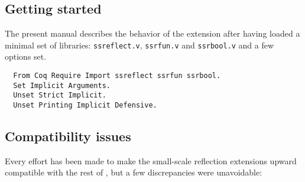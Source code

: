\subsection{Getting started}\label{sec:files}
The present manual describes the behavior of
the \ssr{} extension after having loaded a minimal set of libraries:
{\tt ssreflect.v}, {\tt ssrfun.v} and {\tt ssrbool.v} and a few options set.

\begin{lstlisting}
  From Coq Require Import ssreflect ssrfun ssrbool.
  Set Implicit Arguments.
  Unset Strict Implicit.
  Unset Printing Implicit Defensive.
\end{lstlisting}

\subsection{Compatibility issues}\label{sec:compat}
Every effort has been made to make the small-scale reflection
extensions upward compatible with the rest of \Coq{}, but a few
discrepancies were unavoidable:

